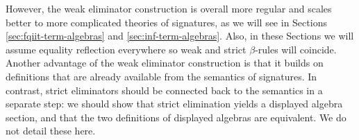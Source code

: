\documentclass[12pt,a4paper,twoside,openany]{book}
\theoremstyle{remark}
\theoremstyle{definition}
\theoremstyle{theorem}
\newcommand{\Tm}{\mathsf{Tm}}
\newcommand{\Ty}{\mathsf{Ty}}
\begin{document}
However, the weak eliminator construction is overall more regular and scales
better to more complicated theories of signatures, as we will see in Sections
\ref{sec:fqiit-term-algebras} and \ref{sec:inf-term-algebras}. Also, in these
Sections we will assume equality reflection everywhere so weak and strict
$\beta$-rules will coincide. Another advantage of the weak eliminator
construction is that it builds on definitions that are already available from
the semantics of signatures. In contrast, strict eliminators should be connected
back to the semantics in a separate step: we should show that strict elimination
yields a displayed algebra section, and that the two definitions of displayed
algebras are equivalent. We do not detail these here.





\end{document}
